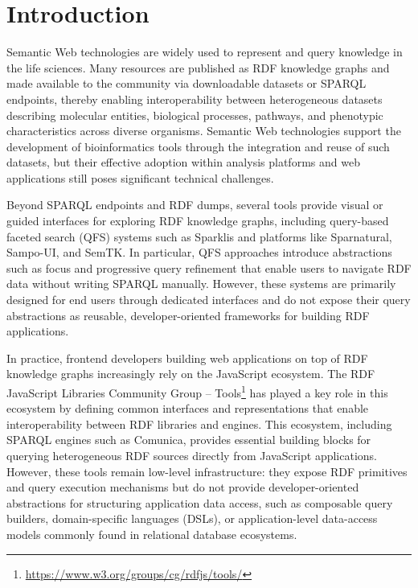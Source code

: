 \documentclass[
]{ceurart}
\begin{document}
\maketitle

\section{Introduction}


Semantic Web technologies are widely used to represent and query knowledge in
the life sciences\citep{wu_semantic_2014}. Many resources are published as RDF
knowledge graphs and made available to the community via downloadable datasets
or SPARQL endpoints, thereby enabling interoperability between heterogeneous
datasets describing molecular entities, biological processes, pathways, and
phenotypic characteristics across diverse
organisms\citep{LODCloudLifeSciences}. Semantic Web technologies support the
development of bioinformatics tools through the integration and reuse of such
datasets, but their effective adoption within analysis platforms and web
applications still poses significant technical challenges.

Beyond SPARQL endpoints and RDF dumps, several tools provide visual or guided 
interfaces for exploring RDF knowledge graphs, including query-based faceted 
search (QFS) systems such as Sparklis\citep{ferre_sparklis_2016} and platforms 
like Sparnatural\citep{francart_sparnatural_2023}, Sampo-UI\citep{ikkala_sampo-ui_2021}, 
and SemTK\citep{cuddihy_semtk_2017}. In particular, QFS approaches introduce abstractions 
such as focus and progressive query refinement that enable users to navigate RDF 
data without writing SPARQL manually. However, these systems are primarily designed 
for end users through dedicated interfaces and do not expose their query abstractions 
as reusable, developer-oriented frameworks for building RDF applications.

In practice, frontend developers building web applications on top of RDF
knowledge graphs increasingly rely on the JavaScript ecosystem. The RDF
JavaScript Libraries Community Group -- Tools\footnote{\url{https://www.w3.org/groups/cg/rdfjs/tools/}}
has played a key role in this ecosystem by defining common interfaces and
representations that enable interoperability between RDF libraries and
engines. This ecosystem, including SPARQL engines such as
Comunica\citep{taelman_comunica_2018}, provides essential building blocks for
querying heterogeneous RDF sources directly from JavaScript applications.
However, these tools remain low-level infrastructure: they expose RDF
primitives and query execution mechanisms but do not provide
developer-oriented abstractions for structuring application data access, such
as composable query builders, domain-specific languages (DSLs), or
application-level data-access models commonly found in relational database
ecosystems.
\end{document}
